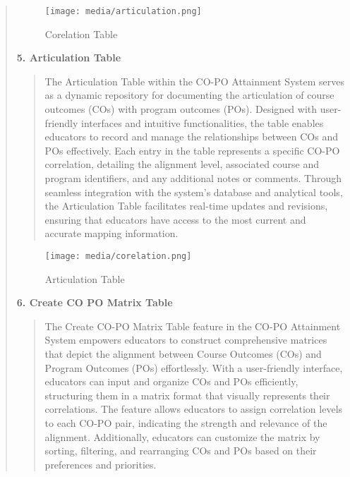 \documentclass[12pt]{report}
\begin{document}
\begin{quote}
\begin{quote}
		\end{quote}
		\begin{figure}[h]
			\centering
			\texttt{[image: media/articulation.png]}\\
			\caption{Corelation Table}
			\vspace{0.5cm}
		\end{figure}
		\clearpage
		
		\textbf{5. Articulation Table}\\
		\begin{quote}
			The Articulation Table within the CO-PO Attainment System serves as a dynamic repository for documenting the articulation of course outcomes (COs) with program outcomes (POs). Designed with user-friendly interfaces and intuitive functionalities, the table enables educators to record and manage the relationships between COs and POs effectively. Each entry in the table represents a specific CO-PO correlation, detailing the alignment level, associated course and program identifiers, and any additional notes or comments. Through seamless integration with the system's database and analytical tools, the Articulation Table facilitates real-time updates and revisions, ensuring that educators have access to the most current and accurate mapping information. 
			\\[3ex]
			
		\end{quote}
		
		\begin{figure}[h]
			\centering
			\texttt{[image: media/corelation.png]}\\
			\caption{Articulation Table}
			\vspace{0.5cm}
		\end{figure}
		\clearpage
		
		\textbf{6. Create CO PO Matrix Table}\\
		\begin{quote}
			The Create CO-PO Matrix Table feature in the CO-PO Attainment System empowers educators to construct comprehensive matrices that depict the alignment between Course Outcomes (COs) and Program Outcomes (POs) effortlessly. With a user-friendly interface, educators can input and organize COs and POs efficiently, structuring them in a matrix format that visually represents their correlations. The feature allows educators to assign correlation levels to each CO-PO pair, indicating the strength and relevance of the alignment. Additionally, educators can customize the matrix by sorting, filtering, and rearranging COs and POs based on their preferences and priorities.
			\\[3ex]
			

\end{quote}
\end{quote}
\end{document}
